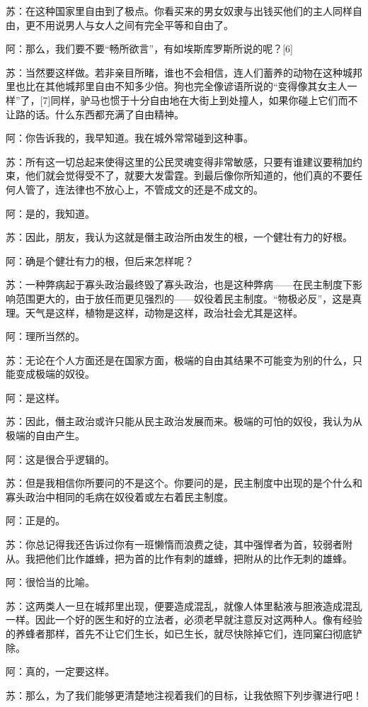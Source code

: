 \documentclass[12pt,oneside]{book}
\begin{document}
苏：在这种国家里自由到了极点。你看买来的男女奴隶与出钱买他们的主人同样自由，更不用说男人与女人之间有完全平等和自由了。

阿：那么，我们要不要“畅所欲言”，有如埃斯库罗斯所说的呢？[6]

苏：当然要这样做。若非亲目所睹，谁也不会相信，连人们蓄养的动物在这种城邦里也比在其他城邦里自由不知多少倍。狗也完全像谚语所说的“变得像其女主人一样”了，[7]同样，驴马也惯于十分自由地在大街上到处撞人，如果你碰上它们而不让路的话。什么东西都充满了自由精神。

阿：你告诉我的，我早知道。我在城外常常碰到这种事。

苏：所有这一切总起来使得这里的公民灵魂变得非常敏感，只要有谁建议要稍加约束，他们就会觉得受不了，就要大发雷霆。到最后像你所知道的，他们真的不要任何人管了，连法律也不放心上，不管成文的还是不成文的。

阿：是的，我知道。

苏：因此，朋友，我认为这就是僭主政治所由发生的根，一个健壮有力的好根。

阿：确是个健壮有力的根，但后来怎样呢？

苏：一种弊病起于寡头政治最终毁了寡头政治，也是这种弊病——在民主制度下影响范围更大的，由于放任而更见强烈的——奴役着民主制度。“物极必反”，这是真理。天气是这样，植物是这样，动物是这样，政治社会尤其是这样。

阿：理所当然的。

苏：无论在个人方面还是在国家方面，极端的自由其结果不可能变为别的什么，只能变成极端的奴役。

阿：是这样。

苏：因此，僭主政治或许只能从民主政治发展而来。极端的可怕的奴役，我认为从极端的自由产生。

阿：这是很合乎逻辑的。

苏：但是我相信你所要问的不是这个。你要问的是，民主制度中出现的是个什么和寡头政治中相同的毛病在奴役着或左右着民主制度。

阿：正是的。

苏：你总记得我还告诉过你有一班懒惰而浪费之徒，其中强悍者为首，较弱者附从。我把他们比作雄蜂，把为首的比作有刺的雄蜂，把附从的比作无刺的雄蜂。

阿：很恰当的比喻。

苏：这两类人一旦在城邦里出现，便要造成混乱，就像人体里黏液与胆液造成混乱一样。因此一个好的医生和好的立法者，必须老早就注意反对这两种人。像有经验的养蜂者那样，首先不让它们生长，如已生长，就尽快除掉它们，连同窠臼彻底铲除。

阿：真的，一定要这样。

苏：那么，为了我们能够更清楚地注视着我们的目标，让我依照下列步骤进行吧！
\end{document}

